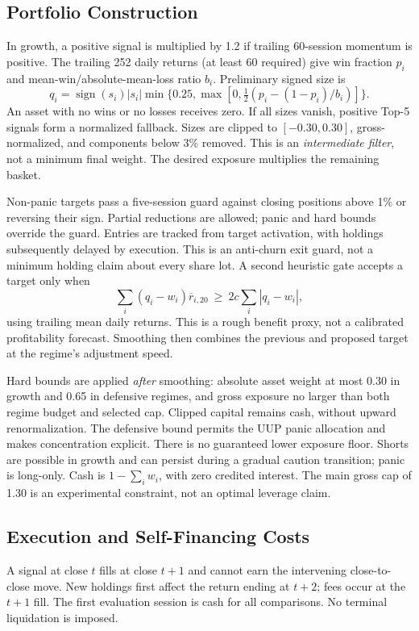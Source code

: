 \documentclass[3p,times]{elsarticle}
\begin{document}
\subsection{Portfolio Construction}
In growth, a positive signal is multiplied by 1.2 if trailing 60-session momentum is positive. The trailing 252 daily returns (at least 60 required) give win fraction $p_i$ and mean-win/absolute-mean-loss ratio $b_i$. Preliminary signed size is
\begin{equation}q_i=\operatorname{sign}(s_i)|s_i|\min\{0.25,\max[0,\tfrac12(p_i-(1-p_i)/b_i)]\}.\end{equation}
An asset with no wins or no losses receives zero. If all sizes vanish, positive Top-5 signals form a normalized fallback. Sizes are clipped to $[-0.30,0.30]$, gross-normalized, and components below 3\% removed. This is an \emph{intermediate filter}, not a minimum final weight. The desired exposure multiplies the remaining basket.

Non-panic targets pass a five-session guard against closing positions above 1\% or reversing their sign. Partial reductions are allowed; panic and hard bounds override the guard. Entries are tracked from target activation, with holdings subsequently delayed by execution. This is an anti-churn exit guard, not a minimum holding claim about every share lot. A second heuristic gate accepts a target only when
\begin{equation}\sum_i(q_i-w_i)\overline r_{i,20}\ \ge\ 2c\sum_i|q_i-w_i|,\end{equation}
using trailing mean daily returns. This is a rough benefit proxy, not a calibrated profitability forecast. Smoothing then combines the previous and proposed target at the regime's adjustment speed.

Hard bounds are applied \emph{after} smoothing: absolute asset weight at most 0.30 in growth and 0.65 in defensive regimes, and gross exposure no larger than both regime budget and selected cap. Clipped capital remains cash, without upward renormalization. The defensive bound permits the UUP panic allocation and makes concentration explicit. There is no guaranteed lower exposure floor. Shorts are possible in growth and can persist during a gradual caution transition; panic is long-only. Cash is $1-\sum_iw_i$, with zero credited interest. The main gross cap of 1.30 is an experimental constraint, not an optimal leverage claim.

\subsection{Execution and Self-Financing Costs}
A signal at close $t$ fills at close $t+1$ and cannot earn the intervening close-to-close move. New holdings first affect the return ending at $t+2$; fees occur at the $t+1$ fill. The first evaluation session is cash for all comparisons. No terminal liquidation is imposed.
\end{document}
